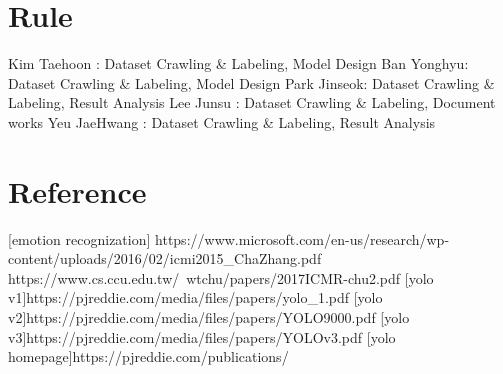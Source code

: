 \documentclass{article}
\begin{document}
\section{Rule}
Kim Taehoon : Dataset Crawling \& Labeling, Model Design \newline
Ban Yonghyu: Dataset Crawling \& Labeling, Model Design \newline
Park Jinseok: Dataset Crawling \& Labeling, Result Analysis \newline
Lee Junsu : Dataset Crawling \& Labeling, Document works \newline
Yeu JaeHwang : Dataset Crawling \& Labeling, Result Analysis \newline

\section{Reference}
[emotion recognization]
https://www.microsoft.com/en-us/research/wp-content/uploads/2016/02/icmi2015\_ChaZhang.pdf
https://www.cs.ccu.edu.tw/~wtchu/papers/2017ICMR-chu2.pdf
[yolo v1]https://pjreddie.com/media/files/papers/yolo\_1.pdf
[yolo v2]https://pjreddie.com/media/files/papers/YOLO9000.pdf
[yolo v3]https://pjreddie.com/media/files/papers/YOLOv3.pdf
[yolo homepage]https://pjreddie.com/publications/
\end{document}
